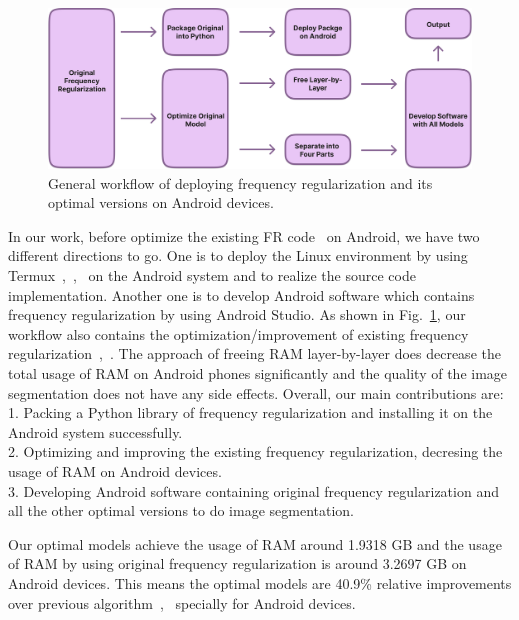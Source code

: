 \documentclass[runningheads]{llncs}
\begin{document}
\begin{figure}[htbp]
	\centering
	\label{image:workflow}
	\includegraphics[width=1\linewidth]{figures/workflow.jpg}
	\caption{General workflow of deploying frequency regularization and its optimal versions on Android devices.}
\end{figure}

In our work, before optimize the existing FR code~\cite{fr_repo} on Android, we have two different directions to go. One is to deploy the Linux environment by using Termux~\cite{termux_repo},~\cite{termux_overview},~\cite{termux_wiki} on the Android system and to realize the source code implementation. Another one is to develop Android software which contains frequency regularization by using Android Studio. As shown in Fig.~\ref{image:workflow}, our workflow also contains the optimization/improvement of existing frequency regularization~\cite{zhao2023fr},~\cite{fr_repo}. The approach of freeing RAM layer-by-layer does decrease the total usage of RAM on Android phones significantly and the quality of the image segmentation does not have any side effects. Overall, our main contributions are:\\
1. Packing a Python library of frequency regularization and installing it on the Android system successfully.\\
2. Optimizing and improving the existing frequency regularization, decresing the usage of RAM on Android devices.\\
3. Developing Android software containing original frequency regularization and all the other optimal versions to do image segmentation.

Our optimal models achieve the usage of RAM around 1.9318 GB and the usage of RAM by using original frequency regularization is around 3.2697 GB on Android devices. This means the optimal models are  40.9\% relative improvements over previous algorithm~\cite{zhao2023fr},~\cite{fr_repo} specially for Android devices.
\end{document}
